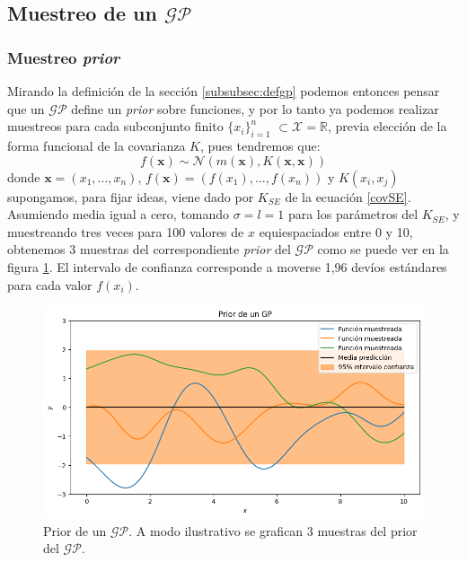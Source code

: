 \documentclass[a4paper]{article}
\newcommand{\gp}{\ensuremath{\mathcal{GP}}}
\begin{document}



\subsection{Muestreo de un $\gp$}
\label{subsec:muestreoGP}

\subsubsection{Muestreo \emph{prior}}
Mirando la definición de la sección \ref{subsubsec:defgp} podemos entonces pensar que un $\gp$ define un \emph{prior} sobre funciones, y por lo tanto ya podemos realizar muestreos para cada subconjunto finito $\{x_i\}_{i=1}^n$ $\subset \mathcal{X}=\mathbb{R}$, previa elección de la forma funcional de la covarianza $K$, pues tendremos que:
$$ 	f(\mathbf{x}) \sim \mathcal{N}(m(\mathbf{x}), K(\mathbf{x},\mathbf{x})) $$
donde $\mathbf{x}=(x_1,\dots,x_n)$, $f(\mathbf{x}) = (f(x_1),\dots,f(x_n))$ y $K(x_i,x_j)$ supongamos, para fijar ideas, viene dado por $K_{SE}$ de la ecuación \ref{covSE}. Asumiendo media igual a cero, tomando $\sigma=l=1$ para los parámetros del $K_{SE}$, y muestreando tres veces para 100 valores de $x$ equiespaciados entre 0 y 10, obtenemos 3 muestras del correspondiente \emph{prior} del $\gp$ como se puede ver en la figura \ref{fig:gprior}. El intervalo de confianza corresponde a moverse 1,96 devíos estándares para cada valor $f(x_i)$.
\begin{figure}[H]
	\centering
	\includegraphics[trim={0cm 0cm 0cm 0cm},clip,width=\textwidth]{gpprior.png}
	\caption{Prior de un $\gp$. A modo ilustrativo se grafican 3 muestras del prior del $\gp$.}
	\label{fig:gprior}
\end{figure}
\end{document}
